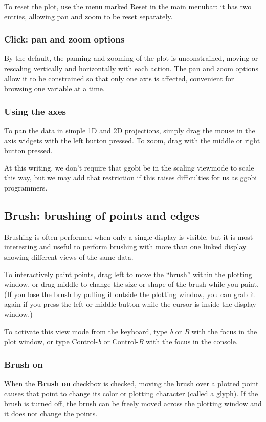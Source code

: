 \documentclass[11pt]{article}
\begin{document}
To reset the plot, use the menu marked Reset in the main menubar:
it has two entries, allowing pan and zoom to be reset separately.

\subsubsection{Click: pan and zoom options}

By the default, the panning and zooming of the plot is unconstrained,
moving or rescaling vertically and horizontally with each action.
The pan and zoom options allow it to be constrained so that only
one axis is affected, convenient for browsing one variable at a time.

\subsubsection{Using the axes}

To pan the data in simple 1D and 2D projections, simply drag the mouse
in the axis widgets with the left button pressed.  To zoom, drag with
the middle or right button pressed.

At this writing, we don't require that ggobi be in the scaling viewmode to
scale this way, but we may add that restriction if this raises 
difficulties for us as ggobi programmers.

\subsection{Brush: brushing of points and edges}
\label{slbl:Brush}

Brushing is often performed when only a single display is visible,
but it is most interesting and useful to perform brushing with more
than one linked display showing different views of the same data.  

To interactively paint points, drag left to move the ``brush'' within
the plotting window, or drag middle to change the size or shape of
the brush while you paint.  (If you lose the brush by pulling it
outside the plotting window, you can grab it again if you press the
left or middle button while the cursor is inside the display window.)

To activate this view mode from the keyboard, type {\em b} or {\em B}
with the focus in the plot window, or type Control-{\em b} or
Control-{\em B} with the focus in the console.

\subsubsection{Brush on}
%
When the {\bf Brush on} checkbox is checked, moving the brush
over a plotted point causes that point to change its color or
plotting character (called a glyph).  If the brush is turned off, the
brush can be freely moved across the plotting window and it does not
change the points.
\end{document}
